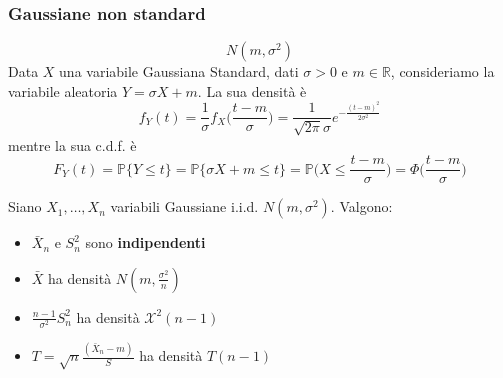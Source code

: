 \subsubsection{Gaussiane non standard}
\begin{equation}
	N(m, \sigma^2)
\end{equation}
Data $X$ una variabile Gaussiana Standard, dati $\sigma >0$ e $m \in \mathbb{R}$, consideriamo la variabile aleatoria $Y = \sigma X +m$. La sua densità è
\begin{equation}
	f_Y(t) = \frac{1}{\sigma}f_X\bigg(\frac{t-m}{\sigma}\bigg) = \frac{1}{\sqrt{2 \pi}\sigma}e^{-\frac{(t-m)^2}{2\sigma^2}}
\end{equation}
mentre la sua c.d.f. è
\begin{equation}
	F_Y(t)= \mathbb{P}\{Y \leq t\} = \mathbb{P}\{\sigma X + m \leq t\} = \mathbb{P}\bigg(X \leq \frac{t-m}{\sigma}\bigg) = \Phi \bigg(\frac{t-m}{\sigma}\bigg)
\end{equation}

\begin{theorem}
	Siano $X_1, \ldots, X_n$ variabili Gaussiane i.i.d. $N(m, \sigma^2)$. Valgono:
	\begin{itemize}
		\item $\bar{X}_n$ e $S_n^2$ sono \textbf{indipendenti}
		\item $\bar{X}$ ha densità $N(m, \frac{\sigma^2}{n})$
		\item $\frac{n-1}{\sigma^2}S_n^2$ ha densità $\mathcal{X}^2(n-1)$
		\item $T=\sqrt{n}\frac{(\bar{X}_n - m)}{S}$ ha densità $T(n-1)$
	\end{itemize}
\end{theorem}

